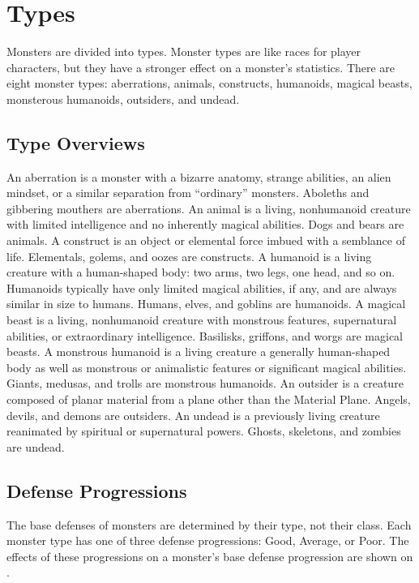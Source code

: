 \chapter{Types}\label{Types}

Monsters are divided into types.
Monster types are like races for player characters, but they have a stronger effect on a monster's statistics.
There are eight monster types: aberrations, animals, constructs, humanoids, magical beasts, monsterous humanoids, outsiders, and undead.

\section{Type Overviews}

     An aberration is a monster with a bizarre anatomy, strange abilities, an alien mindset, or a similar separation from ``ordinary'' monsters.
    Aboleths and gibbering mouthers are aberrations.
     An animal is a living, nonhumanoid creature with limited intelligence and no inherently magical abilities.
    Dogs and bears are animals.
     A construct is an object or elemental force imbued with a semblance of life.
    Elementals, golems, and oozes are constructs.
     A humanoid is a living creature with a human-shaped body: two arms, two legs, one head, and so on.
    Humanoids typically have only limited magical abilities, if any, and are always similar in size to humans.
    Humans, elves, and goblins are humanoids.
     A magical beast is a living, nonhumanoid creature with monstrous features, supernatural abilities, or extraordinary intelligence.
    Basilisks, griffons, and worgs are magical beasts.
     A monstrous humanoid is a living creature a generally human-shaped body as well as monstrous or animalistic features or significant magical abilities.
    Giants, medusas, and trolls are monstrous humanoids.
     An outsider is a creature composed of planar material from a plane other than the Material Plane.
    Angels, devils, and demons are outsiders.
     An undead is a previously living creature reanimated by spiritual or supernatural powers.
    Ghosts, skeletons, and zombies are undead.

\section{Defense Progressions}
    The base defenses of monsters are determined by their type, not their class.
    Each monster type has one of three defense progressions: Good, Average, or Poor.
    The effects of these progressions on a monster's base defense progression are shown on .

